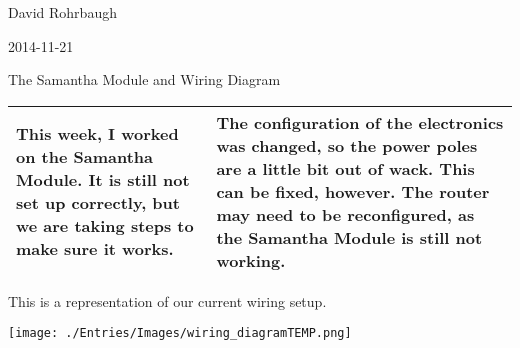 David Rohrbaugh

2014-11-21

The Samantha Module and Wiring Diagram

\begin{tabular}{|p{5cm}|p{5cm}|}
 \hline
 This week, I worked on the Samantha Module. It is still not set up correctly, but we are taking steps to make sure it works.
 &
 The configuration of the electronics was changed, so the power poles are a little bit out of wack. This can be fixed, however. The router may need to be reconfigured, as the Samantha Module is still not working.
 \\
 \hline
\end{tabular}

\medskip

This is a representation of our current wiring setup.

\begin{center}
 \texttt{[image: ./Entries/Images/wiring\_diagramTEMP.png]}
\end{center}